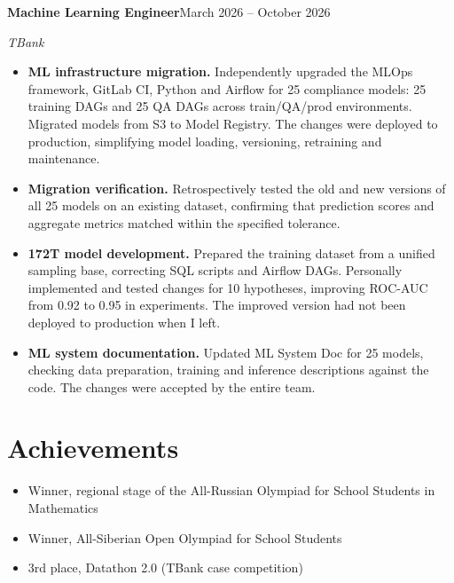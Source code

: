 \documentclass[a4paper,11pt]{article}
\newcommand{\entry}[3]{\textbf{#1}\hfill #3\par\textit{#2}\par}
\begin{document}
\vspace{4pt}
\entry{Machine Learning Engineer}{TBank}{March 2026 -- October 2026}
\begin{itemize}
\item \textbf{ML infrastructure migration.} Independently upgraded the MLOps framework, GitLab CI, Python and Airflow for 25 compliance models: 25 training DAGs and 25 QA DAGs across train/QA/prod environments. Migrated models from S3 to Model Registry. The changes were deployed to production, simplifying model loading, versioning, retraining and maintenance.
\item \textbf{Migration verification.} Retrospectively tested the old and new versions of all 25 models on an existing dataset, confirming that prediction scores and aggregate metrics matched within the specified tolerance.
\item \textbf{172T model development.} Prepared the training dataset from a unified sampling base, correcting SQL scripts and Airflow DAGs. Personally implemented and tested changes for 10 hypotheses, improving ROC-AUC from 0.92 to 0.95 in experiments. The improved version had not been deployed to production when I left.
\item \textbf{ML system documentation.} Updated ML System Doc for 25 models, checking data preparation, training and inference descriptions against the code. The changes were accepted by the entire team.
\end{itemize}
\endgroup
\section*{Achievements}
\begin{itemize}
\item Winner, regional stage of the All-Russian Olympiad for School Students in Mathematics
\item Winner, All-Siberian Open Olympiad for School Students
\item 3rd place, Datathon 2.0 (TBank case competition)
\end{itemize}
\newpage
\end{document}
